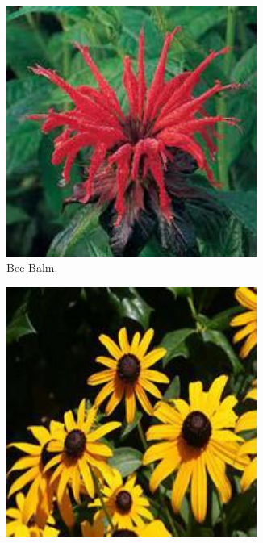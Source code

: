 \begin{figure}
    \centering
    \begin{subfigure}{0.24\textwidth}
        \centering
        \includegraphics[width=0.9\textwidth]{../example_images/BeeBalm.jpg}
        \caption{Bee Balm.}
    \end{subfigure}
    \vspace{0.07cm}
    \begin{subfigure}{0.24\textwidth}
        \centering
        \includegraphics[width=0.9\textwidth]{../example_images/Black-eyedSusan.jpg}

\end{subfigure}
\end{figure}
